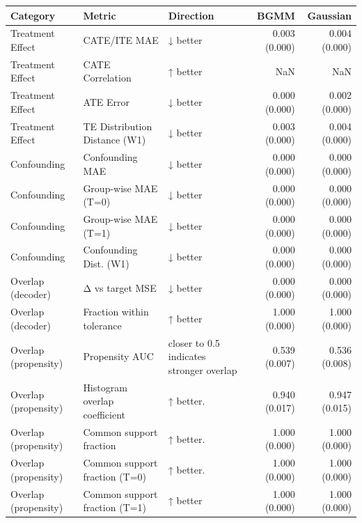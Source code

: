 \begin{tabular}{lllrr}
\toprule
            Category &                        Metric &                                Direction &          BGMM &      Gaussian \\
\midrule
    Treatment Effect &                  CATE/ITE MAE &                                 ↓ better & 0.003 (0.000) & 0.004 (0.000) \\
    Treatment Effect &              CATE Correlation &                                 ↑ better &           NaN &           NaN \\
    Treatment Effect &                     ATE Error &                                 ↓ better & 0.000 (0.000) & 0.002 (0.000) \\
    Treatment Effect & TE Distribution Distance (W1) &                                 ↓ better & 0.003 (0.000) & 0.004 (0.000) \\
         Confounding &               Confounding MAE &                                 ↓ better & 0.000 (0.000) & 0.000 (0.000) \\
         Confounding &          Group-wise MAE (T=0) &                                 ↓ better & 0.000 (0.000) & 0.000 (0.000) \\
         Confounding &          Group-wise MAE (T=1) &                                 ↓ better & 0.000 (0.000) & 0.000 (0.000) \\
         Confounding &        Confounding Dist. (W1) &                                 ↓ better & 0.000 (0.000) & 0.000 (0.000) \\
   Overlap (decoder) &               Δ vs target MSE &                                 ↓ better & 0.000 (0.000) & 0.000 (0.000) \\
   Overlap (decoder) &     Fraction within tolerance &                                 ↑ better & 1.000 (0.000) & 1.000 (0.000) \\
Overlap (propensity) &                Propensity AUC & closer to 0.5 indicates stronger overlap & 0.539 (0.007) & 0.536 (0.008) \\
Overlap (propensity) & Histogram overlap coefficient &                                ↑ better. & 0.940 (0.017) & 0.947 (0.015) \\
Overlap (propensity) &       Common support fraction &                                ↑ better. & 1.000 (0.000) & 1.000 (0.000) \\
Overlap (propensity) & Common support fraction (T=0) &                                ↑ better. & 1.000 (0.000) & 1.000 (0.000) \\
Overlap (propensity) & Common support fraction (T=1) &                                 ↑ better & 1.000 (0.000) & 1.000 (0.000) \\
\bottomrule
\end{tabular}
